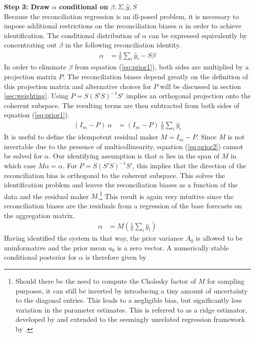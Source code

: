 \documentclass[a4paper,fleqn,11pt]{article}
\begin{document}
\clearpage
\noindent\textbf{Step 3: Draw $\alpha$ conditional on $\beta,\Sigma,\hat{y},S$}\\
Because the reconciliation regression is an ill-posed problem, it is necessary to impose additional restrictions on the reconciliation biases $\alpha$ in order to achieve identification. The conditional distribution of $\alpha$ can be expressed equivalently by concentrating out $\beta$ in the following reconciliation identity.
\begin{align}
	\label{eq:prior1}
	\alpha &= \frac{1}{n}\sum_i \hat{y}_i - S\beta
\end{align}
In order to eliminate $\beta$ from equation (\ref{eq:prior1}), both sides are multiplied by a projection matrix $P$. The reconciliation biases depend greatly on the definition of this projection matrix and alternative choices for $P$ will be discussed in section \ref{sec:weighting}. Using $P = S(S'S)^{-1}S'$ implies an orthogonal projection onto the coherent subspace. The resulting terms are then subtracted from both sides of equation (\ref{eq:prior1}).
\begin{align}
	\label{eq:prior2}
	(I_m - P)\ \alpha &= (I_m - P)\ \frac{1}{n}\sum_i \hat{y}_i  
\end{align}
It is useful to define the idempotent residual maker $M = I_m - P$. Since $M$ is not invertable due to the presence of multicollinearity, equation (\ref{eq:prior2}) cannot be solved for $\alpha$. Our identifying assumption is that $\alpha$ lies in the span of $M$ in which case $M\alpha = \alpha$. For $P=S(S'S)^{-1}S'$, this implies that the direction of the reconciliation bias is orthogonal to the coherent subspace.  This solves the identification problem and leaves the reconciliation biases as a function of the data and the residual maker $M$.\footnote{Should there be the need to compute the Cholesky factor of $M$ for sampling purposes, it can still be inverted by introducing a tiny amount of uncertainty to the diagonal entries. This leads to a negligible bias, but significantly less variation in the parameter estimates. This is referred to as a ridge estimator, developed by \cite{Brown1980} and extended to the seemingly unrelated regression framework by \cite{Haitovsky1987}.} This result is again very intuitive since the reconciliation biases are the residuals from a regression of the base forecasts on the aggregation matrix.
\begin{align}
\alpha &= M\left(\frac{1}{n}\sum_i \hat{y}_i\right)
\end{align}
 Having identified the system in that way, the prior variance $A_0$ is allowed to be uninformative and the prior mean $a_0$ is a zero vector. A numerically stable conditional posterior for $\alpha$ is therefore given by
\end{document}

